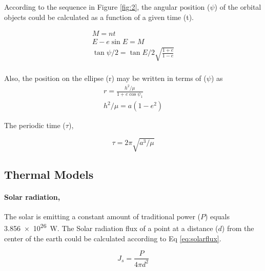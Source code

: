 \documentclass[11pt]{article}
\begin{document}
According to the sequence in Figure \ref{fig:2}, the angular position ($\psi$) of the orbital objects could be calculated as a function of a given time (t).

\begin{gather}\label{eq:12}
    M = n t \\
    E-e\sin{E} = M \\
    \tan{\psi/2} = \tan{E/2}\sqrt{\frac{1+e}{1-e}} \\
\end{gather}

Also, the position on the ellipse (r) may be written in terms of ($\psi$) as
\begin{gather}\label{eq:14}
    r = \frac{h^2/\mu}{1+e\cos{\psi_1}}\\
    h^2/\mu = a(1-e^2)
\end{gather}

The periodic time ($\tau$),
 
\begin{equation}
    \tau = 2\pi\sqrt{a^3/\mu}
\end{equation}



\subsection{Thermal Models}

\paragraph{Solar radiation,} The solar is emitting a constant amount of traditional power ($P$) equals \SI{3.856e26}{\watt}. The Solar radiation flux of a point at a distance ($d$) from the center of the earth could be calculated according to Eq \ref{eq:solarflux}.

\begin{equation} \label{eq:solarflux}
    J_s = \frac{P}{4\pi d^2}
\end{equation}
\end{document}
